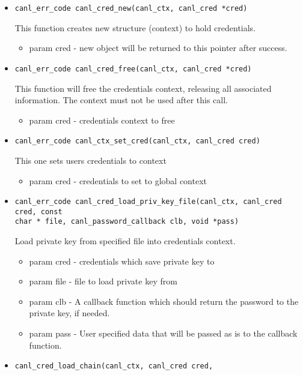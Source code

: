 \begin{itemize}
  \item \begin{verbatim}
canl_err_code canl_cred_new(canl_ctx, canl_cred *cred)\end{verbatim}
This function creates new structure (context) to hold credentials.
  \begin{itemize}
    \item param cred - new object will be returned to this pointer after
    success.
  \end{itemize}
  \item \begin{verbatim}
canl_err_code canl_cred_free(canl_ctx, canl_cred *cred)\end{verbatim}
  This function will free the credentials context, releasing
  all associated information.  The context must not be used after this call.
  \begin{itemize}
    \item param cred - credentials context to free 
  \end{itemize}
  \item \begin{verbatim}
canl_err_code canl_ctx_set_cred(canl_ctx, canl_cred cred)\end{verbatim}
  This one sets users credentials to \CANL context
  \begin{itemize}
    \item param cred - credentials to set to global \CANL context
  \end{itemize}
  \item \begin{verbatim}
canl_err_code canl_cred_load_priv_key_file(canl_ctx, canl_cred cred, const 
char * file, canl_password_callback clb, void *pass)\end{verbatim}
  Load private key from specified file into credentials context.
  \begin{itemize}
    \item param cred - credentials which save private key to
    \item param file - file to load private key from
    \item param clb - A callback function which should return
    the password to the private key, if needed.
    \item param pass - User specified data that will be passed
    as is to the callback function.
  \end{itemize}
  \item \verb'canl_cred_load_chain(canl_ctx, canl_cred cred,'

\end{itemize}
